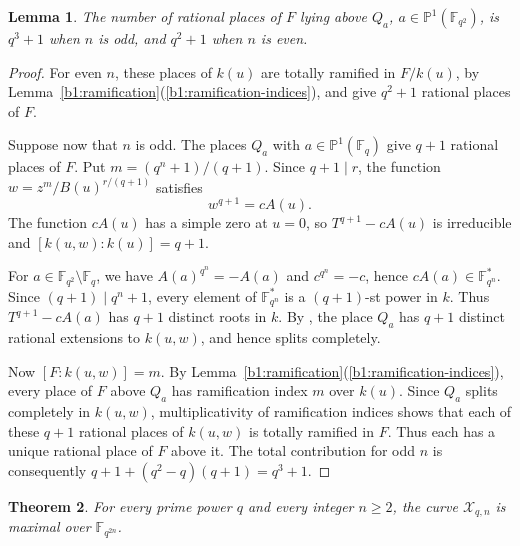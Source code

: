 \documentclass[10pt,a4paper]{amsart}
\numberwithin{equation}{section}
\newcommand{\F}{\mathbb F}
\newcommand{\PP}{\mathbb P}
\newtheorem{theorem}{Theorem}[section]
\newtheorem{lemma}[theorem]{Lemma}
\begin{document}
\begin{lemma}
\label{b1:ramified-rational-places}
The number of rational places of \(F\) lying above \(Q_a\),
\(a\in\PP^1(\F_{q^2})\), is \(q^3+1\) when \(n\) is
odd, and \(q^2+1\) when \(n\) is even.
\end{lemma}

\begin{proof}
For even \(n\), these places of \(k(u)\) are totally ramified in
\(F/k(u)\), by Lemma~\ref{b1:ramification}(\ref{b1:ramification-indices}), and give \(q^2+1\)
rational places of \(F\).

Suppose now that \(n\) is odd. The places \(Q_a\) with
\(a\in\PP^1(\F_q)\) give \(q+1\) rational places of \(F\).
Put \(m=(q^n+1)/(q+1)\). Since \(q+1\mid r\), the function
\(w=z^m/B(u)^{r/(q+1)}\) satisfies
\begin{equation}
\label{b1:intermediate-equation}
 w^{q+1}=cA(u).
\end{equation}
The function \(cA(u)\) has a simple zero at \(u=0\), so
\(T^{q+1}-cA(u)\) is irreducible and
\([k(u,w):k(u)]=q+1\).

For \(a\in\F_{q^2}\setminus\F_q\), we have
\(A(a)^{q^n}=-A(a)\) and \(c^{q^n}=-c\), hence
\(cA(a)\in\F_{q^n}^*\).  Since \((q+1)\mid q^n+1\), every element of
\(\F_{q^n}^*\) is a \((q+1)\)-st power in \(k\). Thus
\(T^{q+1}-cA(a)\) has \(q+1\) distinct roots in \(k\).
By \cite[Corollary~3.3.8(c)]{Stichtenoth2009}, the place \(Q_a\)
has \(q+1\) distinct rational extensions to \(k(u,w)\), and hence
splits completely.

Now \([F:k(u,w)]=m\). By
Lemma~\ref{b1:ramification}(\ref{b1:ramification-indices}), every place of \(F\) above
\(Q_a\) has ramification index \(m\) over \(k(u)\).
Since \(Q_a\) splits completely in \(k(u,w)\), multiplicativity of
ramification indices shows that each of these \(q+1\) rational
places of \(k(u,w)\) is totally ramified in \(F\).
Thus each has a unique rational place of \(F\) above it.
The total contribution for odd \(n\) is consequently \(q+1+(q^2-q)(q+1)=q^3+1\).
\end{proof}

\begin{theorem}
\label{b1:maximality}
For every prime power \(q\) and every integer \(n\ge2\), the curve
\(\mathcal X_{q,n}\) is maximal over \(\F_{q^{2n}}\).
\end{theorem}
\end{document}
